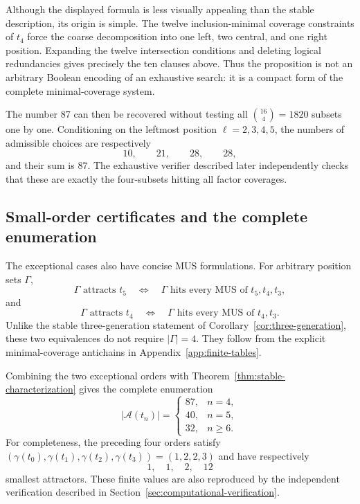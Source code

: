 \documentclass[11pt,a4paper]{article}
\theoremstyle{definition}\newtheorem{definition}[theorem]{Definition}
\theoremstyle{remark}\newtheorem{remark}[theorem]{Remark}
\newcommand{\Acal}{\mathcal{A}}
\begin{document}
Although the displayed formula is less visually appealing than the stable description, its origin is simple.  The twelve inclusion-minimal coverage constraints of $t_4$ force the coarse decomposition into one left, two central, and one right position.  Expanding the twelve intersection conditions and deleting logical redundancies gives precisely the ten clauses above.  Thus the proposition is not an arbitrary Boolean encoding of an exhaustive search: it is a compact form of the complete minimal-coverage system.

The number $87$ can then be recovered without testing all $\binom{16}{4}=1820$ subsets one by one.  Conditioning on the leftmost position $\ell=2,3,4,5$, the numbers of admissible choices are respectively
\[
 10,\qquad21,\qquad28,\qquad28,
\]
and their sum is $87$.  The exhaustive verifier described later independently checks that these are exactly the four-subsets hitting all factor coverages.

\subsection{Small-order certificates and the complete enumeration}
\label{subsec:exceptional-certificates}

The exceptional cases also have concise MUS formulations.  For arbitrary position sets $\Gamma$,
\[
 \Gamma\text{ attracts }t_5
 \quad\Longleftrightarrow\quad
 \Gamma\text{ hits every MUS of }t_5,t_4,t_3,
\]
and
\[
 \Gamma\text{ attracts }t_4
 \quad\Longleftrightarrow\quad
 \Gamma\text{ hits every MUS of }t_4,t_3.
\]
Unlike the stable three-generation statement of Corollary~\ref{cor:three-generation}, these two equivalences do not require $|\Gamma|=4$.  They follow from the explicit minimal-coverage antichains in Appendix~\ref{app:finite-tables}.

Combining the two exceptional orders with Theorem~\ref{thm:stable-characterization} gives the complete enumeration
\[
 |\Acal(t_n)|=
 \begin{cases}
 87,&n=4,\\
 40,&n=5,\\
 32,&n\ge6.
 \end{cases}
\]
For completeness, the preceding four orders satisfy
$
(\gamma(t_0),\gamma(t_1),\gamma(t_2),\gamma(t_3))=(1,2,2,3)
$
and have respectively
\[
 1,\quad1,\quad2,\quad12
\]
smallest attractors.  These finite values are also reproduced by the independent verification described in Section~\ref{sec:computational-verification}.
\end{document}
